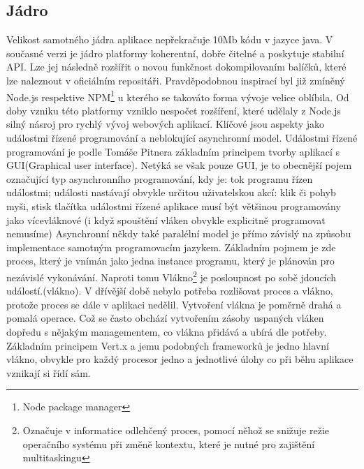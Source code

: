 \subsection{Jádro}

Velikost samotného jádra aplikace nepřekračuje 10Mb kódu v jazyce java. V současné verzi je jádro platformy koherentní, dobře čitelné a poskytuje stabilní API. Lze jej následně rozšířit o novou funkčnost dokompilovaním balíčků, které lze naleznout v oficiálním repositáři. Pravděpodobnou inspirací byl již zmíněný Node.js respektive NPM\footnote{Node package manager} u kterého se takováto forma vývoje velice oblíbila. Od doby vzniku této platformy vzniklo nespočet rozšíření, které udělaly z Node.js silný násroj pro rychlý vývoj webových aplikací. 
Klíčové jsou aspekty jako událostmi řízené programování a neblokující asynchronní model. Událostmi řízené programování je podle Tomáše Pitnera\cite{javaProgramovani} základním principem tvorby aplikací s GUI(Graphical user interface). Netýká se však pouze GUI, je to obecnější pojem označující typ asynchronního programování, kdy je:
tok programu řízen událostmi;
události nastávají obvykle určitou uživatelskou akcí: klik či pohyb myši, stisk tlačítka
událostmi řízené aplikace musí být většinou programovány jako vícevláknové (i když spouštění vláken obvykle explicitně programovat nemusíme)
Asynchronní někdy také paralélní model je přímo závislý na způsobu implementace samotným programovacím jazykem. Základním pojmem je zde proces, který je vnímán jako jedna instance programu, který je plánován pro nezávislé vykonávání. Naproti tomu Vlákno\footnote{Označuje v informatice odlehčený proces, pomocí něhož se snižuje režie operačního systému při změně kontextu, které je nutné pro zajištění multitaskingu} je posloupnost po sobě jdoucích událostí.(vlákno). V dřívější době nebylo potřeba rozlišovat proces a vlákno, protože proces se dále v aplikaci nedělil. Vytvoření vlákna je poměrně drahá a pomalá operace. Což se často obchází vytvořením zásoby uspaných vláken dopředu s nějakým managementem, co vlákna přidává a ubírá dle potřeby. Základním principem Vert.x a jemu podobných frameworků je jedno hlavní vlákno, obvykle pro každý procesor jedno a jednotlivé úlohy co při běhu aplikace vznikají si řídí sám.

